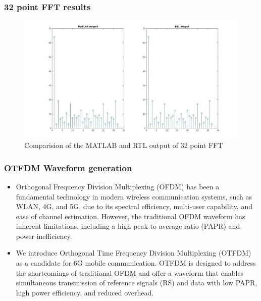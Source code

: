 \documentclass{beamer}
\begin{document}
\begin{frame}
	\frametitle{32 point FFT results}
		\begin{figure}[h!]
		\begin{center}
    			\includegraphics[width=\linewidth]{./figs/fft32.jpg}
		\caption{Comparision of the MATLAB and RTL output of 32 point FFT}
		\label{fig:fig1}
		\end{center}
		\end{figure}	
\end{frame}

\begin{frame}
	\frametitle{OTFDM Waveform generation}
	\begin{itemize}
		\item Orthogonal Frequency Division Multiplexing (OFDM) has been a fundamental technology in modern wireless communication systems, such as WLAN, 4G, and 5G, due to its spectral
efficiency, multi-user capability, and ease of channel estimation. However, the traditional
OFDM waveform has inherent limitations, including a high peak-to-average ratio (PAPR) and
power inefficiency.
		\item We introduce Orthogonal Time Frequency Division Multiplexing (OTFDM) as a candidate for 6G mobile communication. OTFDM is designed to address the shortcomings of traditional OFDM and offer a waveform that enables simultaneous transmission of reference signals (RS)
and data with low PAPR, high power efficiency, and reduced overhead.
	\end{itemize}
\end{frame}
\end{document}
